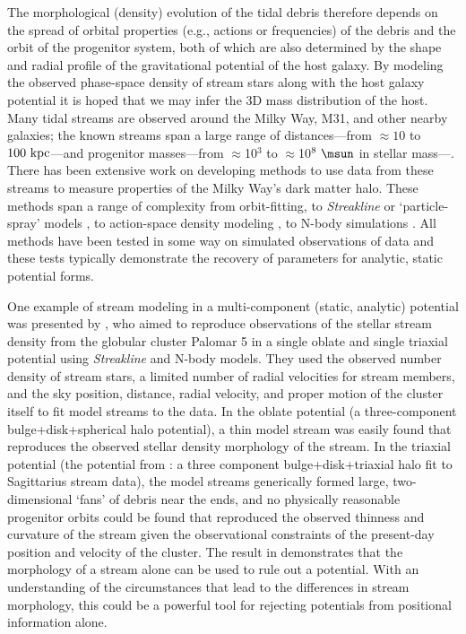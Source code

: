 The morphological (density) evolution of the tidal debris therefore depends on the spread of orbital properties (e.g., actions or frequencies) of the debris and the orbit of the progenitor system, both of which are also determined by the shape and radial profile of the gravitational potential of the host galaxy. By modeling the observed phase-space density of stream stars along with the host galaxy potential it is hoped that we may infer the 3D mass distribution of the host. Many tidal streams are observed around the Milky Way, M31, and other nearby galaxies; the known streams span a large range of distances---from $\approx10$ to $100~{\rm kpc}$---and progenitor masses---from $\approx$10$^3$ to $\approx$10$^8~\msun$ in stellar mass---\citep[][]{ibata94,odenkirchen01,belokurov06,grillmair06a,grillmair06b,bonaca12}. There has been extensive work on developing methods to use data from these streams to measure properties of the Milky Way's dark matter halo. These methods span a range of complexity from orbit-fitting, to \emph{Streakline} \citep{kuepper12} or `particle-spray' models \citep{gibbons14}, to action-space density modeling \citep[e.g.,][]{sanders14, bovy14}, to N-body simulations \citep[e.g.,][]{law10}. All methods have been tested in some way on simulated observations of data and these tests typically demonstrate the recovery of parameters for analytic, static potential forms. 

One example of stream modeling in a multi-component (static, analytic) potential was presented by \citet{pearson15}, who aimed to reproduce observations of the stellar stream density from the globular cluster Palomar 5 in a single oblate and single triaxial potential using \emph{Streakline} \citep{kuepper12} and N-body models. They used the observed number density of stream stars, a limited number of radial velocities for stream members, and the sky position, distance, radial velocity, and proper motion of the cluster itself to fit model streams to the data. In the oblate potential (a three-component bulge+disk+spherical halo potential), a thin model stream was easily found that reproduces the observed stellar density morphology of the stream. In the triaxial potential (the potential from \cite{law10}: a three component bulge+disk+triaxial halo fit to Sagittarius stream data), the model streams generically formed large, two-dimensional `fans' of debris near the ends, and no physically reasonable progenitor orbits could be found that reproduced the observed thinness and curvature of the stream given the observational constraints of the present-day position and velocity of the cluster. The result in \citet{pearson15} demonstrates that the morphology of a stream alone can be used to rule out a potential. With an understanding of the circumstances that lead to the differences in stream morphology, this could be a powerful tool for rejecting potentials from positional information alone.

